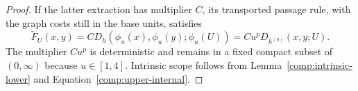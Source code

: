 \begin{proof}
If the latter extraction has multiplier $C$, its transported passage
rule, with the graph costs still in the base units, satisfies
\[
 \widetilde F_U(x,y)
   =C D_h(\phi_u(x),\phi_u(y);\phi_u(U))
   =Cu^pD_{h^{(u)}}(x,y;U).
\]
The multiplier $Cu^p$ is deterministic and remains in a fixed compact
subset of $(0,\infty)$ because $u\in[1,4]$.  Intrinsic scope follows
from Lemma~\ref{comp:intrinsic-lower} and
Equation~\eqref{comp:upper-internal}.
\end{proof}
